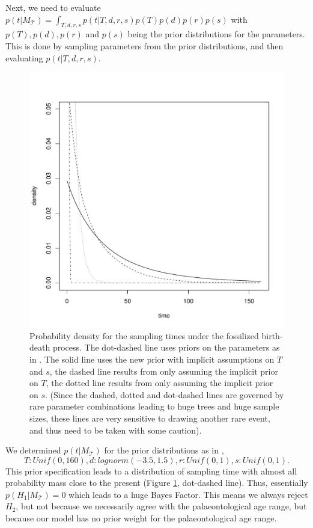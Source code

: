 \documentclass[11pt]{article}
\begin{document}
Next, we need to evaluate $p(t|M_\mathcal{T}) = \int_{T,d,r,s} p(t|T,d,r,s) p(T) p(d) p(r) p(s)$ with $p(T), p(d), p(r)$ and $p(s)$ being the prior distributions for the parameters. This is done by sampling parameters from the prior distributions, and then evaluating $p(t|T,d,r,s)$. 

\begin{figure}
\includegraphics[width=12cm]{priors.pdf}
\caption{\label{hist8_older}Probability density for the sampling times under the fossilized birth-death process. The dot-dashed line uses priors on the parameters as in \cite{gavryushkina2015bayesian}. 
The solid line uses the new prior with implicit assumptions on $T$ and $s$, the dashed line results from only assuming the implicit prior on $T$, the dotted line results from only assuming the  implicit prior on $s$. 
(Since the dashed, dotted and dot-dashed lines are governed by rare parameter combinations leading to huge trees and huge sample sizes, these lines are very sensitive to drawing another rare event, and thus need to be taken with some caution).}
\label{Fig:Prior}
\end{figure}

We determined $p(t|M_\mathcal{T})$ for the prior distributions as in \cite{gavryushkina2015bayesian}, 
$$T: Unif(0,160), d: lognorm(-3.5,1.5), r: Unif(0,1), s: Unif(0,1).$$ This prior specification leads to a distribution of sampling time with almost all probability mass close to the present (Figure \ref{Fig:Prior}, dot-dashed line). Thus, essentially $p(H_1|M_\mathcal{T})=0$  which leads to a huge Bayes Factor. This means we always reject $H_2$, but not because we necessarily agree with the palaeontological age range, but because our model has no prior weight for the palaeontological age range.
\end{document}

